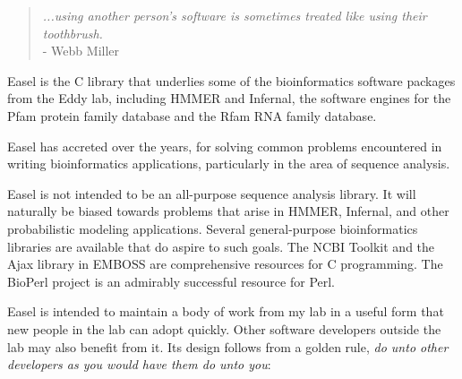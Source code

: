 

\begin{quote}
 \emph{...using another person's software is sometimes treated like 
 using their toothbrush.}\\
\hspace*{1em}\hfill - Webb Miller \citep{Miller01}
\end{quote}


Easel is the C library that underlies some of the bioinformatics
software packages from the Eddy lab, including HMMER and Infernal, the
software engines for the Pfam protein family database and the Rfam RNA
family database.

Easel has accreted over the years, for solving common problems
encountered in writing bioinformatics applications, particularly in
the area of sequence analysis.

Easel is not intended to be an all-purpose sequence analysis library.
It will naturally be biased towards problems that arise in HMMER,
Infernal, and other probabilistic modeling applications.  Several
general-purpose bioinformatics libraries are available that do aspire
to such goals. The NCBI Toolkit and the Ajax library in EMBOSS are
comprehensive resources for C programming. The BioPerl project is an
admirably successful resource for Perl.

Easel is intended to maintain a body of work from my lab in a useful
form that new people in the lab can adopt quickly. Other software
developers outside the lab may also benefit from it. Its design
follows from a golden rule, \emph{do unto other developers as you
would have them do unto you}:

